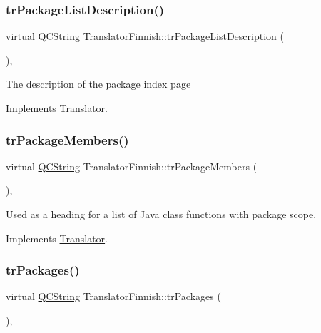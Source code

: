 \subsubsection{\texorpdfstring{trPackageListDescription()}{trPackageListDescription()}}
{\footnotesize\ttfamily virtual \mbox{\hyperlink{class_q_c_string}{Q\+C\+String}} Translator\+Finnish\+::tr\+Package\+List\+Description (\begin{DoxyParamCaption}{ }\end{DoxyParamCaption})\hspace{0.3cm}{\ttfamily [inline]}, {\ttfamily [virtual]}}

The description of the package index page 

Implements \mbox{\hyperlink{class_translator}{Translator}}.

\mbox{\label{class_translator_finnish_a567eec689f5b3edb8e2fdd49b13ef823}} 
\subsubsection{\texorpdfstring{trPackageMembers()}{trPackageMembers()}}
{\footnotesize\ttfamily virtual \mbox{\hyperlink{class_q_c_string}{Q\+C\+String}} Translator\+Finnish\+::tr\+Package\+Members (\begin{DoxyParamCaption}{ }\end{DoxyParamCaption})\hspace{0.3cm}{\ttfamily [inline]}, {\ttfamily [virtual]}}

Used as a heading for a list of Java class functions with package scope. 

Implements \mbox{\hyperlink{class_translator}{Translator}}.

\mbox{\label{class_translator_finnish_aa3c1b40d1a7dad1f91a22008887daf06}} 
\subsubsection{\texorpdfstring{trPackages()}{trPackages()}}
{\footnotesize\ttfamily virtual \mbox{\hyperlink{class_q_c_string}{Q\+C\+String}} Translator\+Finnish\+::tr\+Packages (\begin{DoxyParamCaption}{ }\end{DoxyParamCaption})\hspace{0.3cm}{\ttfamily [inline]}, {\ttfamily [virtual]}}

